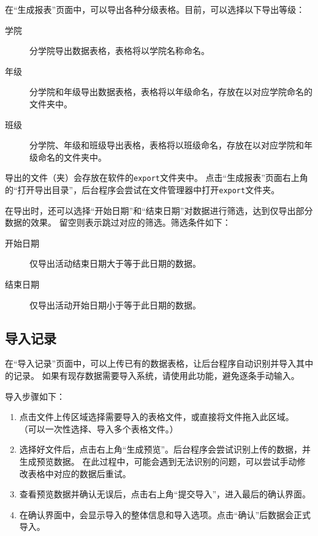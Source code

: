 \documentclass[12pt,titlepage]{article}
\begin{document}
在“生成报表”页面中，可以导出各种分级表格。目前，可以选择以下导出等级：

\begin{description}
    \item[学院] 分学院导出数据表格，表格将以学院名称命名。
    \item[年级] 分学院和年级导出数据表格，表格将以年级命名，存放在以对应学院命名的文件夹中。
    \item[班级] 分学院、年级和班级导出表格，表格将以班级命名，存放在以对应学院和年级命名的文件夹中。
\end{description}

导出的文件（夹）会存放在软件的\texttt{export}文件夹中。
点击“生成报表”页面右上角的“打开导出目录”，后台程序会尝试在文件管理器中打开\texttt{export}文件夹。

在导出时，还可以选择“开始日期”和“结束日期”对数据进行筛选，达到仅导出部分数据的效果。
留空则表示跳过对应的筛选。筛选条件如下：

\begin{description}
    \item[开始日期] 仅导出活动结束日期大于等于此日期的数据。
    \item[结束日期] 仅导出活动开始日期小于等于此日期的数据。
\end{description}

\subsection{导入记录}

在“导入记录”页面中，可以上传已有的数据表格，让后台程序自动识别并导入其中的记录。
如果有现存数据需要导入系统，请使用此功能，避免逐条手动输入。

导入步骤如下：

\begin{enumerate}
    \item 点击文件上传区域选择需要导入的表格文件，或直接将文件拖入此区域。
          （可以一次性选择、导入多个表格文件。）
    \item 选择好文件后，点击右上角“生成预览”。后台程序会尝试识别上传的数据，并生成预览数据。
          在此过程中，可能会遇到无法识别的问题，可以尝试手动修改表格中对应的数据后重试。
    \item 查看预览数据并确认无误后，点击右上角“提交导入”，进入最后的确认界面。
    \item 在确认界面中，会显示导入的整体信息和导入选项。点击“确认”后数据会正式导入。
\end{enumerate}
\end{document}

